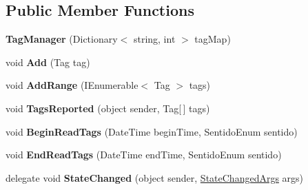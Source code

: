 \subsection*{Public Member Functions}
\begin{DoxyCompactItemize}
\item 
{\bfseries Tag\+Manager} (Dictionary$<$ string, int $>$ tag\+Map)\hypertarget{class_portais_1_1_detection_1_1_tag_manager_ac13bdbf80ae26caa0fcf3c10190f597d}{}\label{class_portais_1_1_detection_1_1_tag_manager_ac13bdbf80ae26caa0fcf3c10190f597d}

\item 
void {\bfseries Add} (Tag tag)\hypertarget{class_portais_1_1_detection_1_1_tag_manager_a597603f0a1321206f2e13d8538337b66}{}\label{class_portais_1_1_detection_1_1_tag_manager_a597603f0a1321206f2e13d8538337b66}

\item 
void {\bfseries Add\+Range} (I\+Enumerable$<$ Tag $>$ tags)\hypertarget{class_portais_1_1_detection_1_1_tag_manager_a6feb5810eb7b0776f4066794cc3b31c3}{}\label{class_portais_1_1_detection_1_1_tag_manager_a6feb5810eb7b0776f4066794cc3b31c3}

\item 
void {\bfseries Tags\+Reported} (object sender, Tag\mbox{[}$\,$\mbox{]} tags)\hypertarget{class_portais_1_1_detection_1_1_tag_manager_a004059f2ee8fe700a120d3739f8aca50}{}\label{class_portais_1_1_detection_1_1_tag_manager_a004059f2ee8fe700a120d3739f8aca50}

\item 
void {\bfseries Begin\+Read\+Tags} (Date\+Time begin\+Time, Sentido\+Enum sentido)\hypertarget{class_portais_1_1_detection_1_1_tag_manager_a2beb3a4f79ff98c637f12f9e2974010e}{}\label{class_portais_1_1_detection_1_1_tag_manager_a2beb3a4f79ff98c637f12f9e2974010e}

\item 
void {\bfseries End\+Read\+Tags} (Date\+Time end\+Time, Sentido\+Enum sentido)\hypertarget{class_portais_1_1_detection_1_1_tag_manager_a47ea2ae4c4800c8bba65106130cb2a94}{}\label{class_portais_1_1_detection_1_1_tag_manager_a47ea2ae4c4800c8bba65106130cb2a94}

\item 
delegate void {\bfseries State\+Changed} (object sender, \hyperlink{class_portais_1_1_detection_1_1_tag_manager_1_1_state_changed_args}{State\+Changed\+Args} args)\hypertarget{class_portais_1_1_detection_1_1_tag_manager_a300442fb531fe628fd8d0367f3037bbc}{}\label{class_portais_1_1_detection_1_1_tag_manager_a300442fb531fe628fd8d0367f3037bbc}

\end{DoxyCompactItemize}
